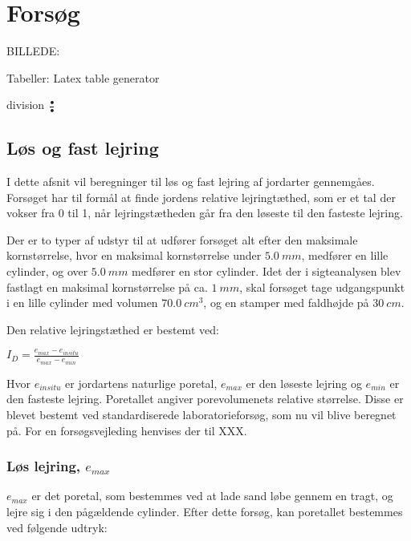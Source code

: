 \chapter{Forsøg}

BILLEDE:



Tabeller:
Latex table generator

division
$\frac{•}{•}$



\section{Løs og fast lejring}


I dette afsnit vil beregninger til løs og fast lejring af jordarter gennemgåes. Forsøget har til formål at finde jordens relative lejringtæthed, som er et tal der vokser fra 0 til 1, når lejringstætheden går fra den løseste til den fasteste lejring.

Der er to typer af udstyr til at udfører forsøget alt efter den maksimale kornstørrelse, hvor en maksimal kornstørrelse under $\SI{5,0}{mm}$, medfører en lille cylinder, og over $\SI{5,0}{mm}$ medfører en stor cylinder. Idet der i sigteanalysen blev fastlagt en maksimal kornstørrelse på ca. $\SI{1}{mm}$,  skal forsøget tage udgangspunkt i en lille cylinder med volumen $\SI{70,0}{cm^{3}}$, og en stamper med faldhøjde på $\SI{30}{cm}$.

Den relative lejringstæthed er bestemt ved:

$I_{D}=\frac{e_{max}-e_{in situ}}{e_{max}-e_{min}}$

Hvor $e_{in situ}$ er jordartens naturlige poretal, $e_{max}$ er den løseste lejring og $e_{min}$ er den fasteste lejring. Poretallet angiver porevolumenets relative størrelse. Disse er blevet bestemt ved standardiserede laboratorieforsøg, som nu vil blive beregnet på. For en forsøgsvejleding henvises der til XXX.

\subsection{Løs lejring, $e_{max}$}

$e_{max}$ er det poretal, som bestemmes ved at lade sand løbe gennem en tragt, og  lejre sig i den pågældende cylinder.
Efter dette forsøg, kan poretallet bestemmes ved følgende udtryk:

